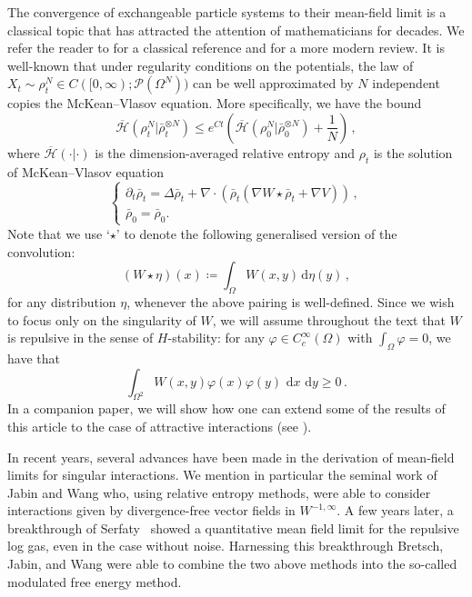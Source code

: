 \documentclass[a4paper,10pt,twoside]{amsart}
\newcommand{\dx}[1]{\,\mathrm{d}#1}  %
\theoremstyle{remark}
\theoremstyle{definition}
\numberwithin{equation}{section}
\newcommand{\0}{{\bf 0}}
\newcommand{\+}{\hspace{-.5ex}+\hspace{-.5ex}}
\begin{document}
The convergence of exchangeable particle systems to their mean-field limit is a classical topic that has attracted the attention of mathematicians for decades. We refer the reader to \cite{Sznitman1991} for a classical reference and \cite{ChaintronDiez2022a,ChaintronDiez2022b} for a more modern review. It is well-known that under regularity conditions on the potentials, the law of $X_t\sim \rho^N_{t}\in C([0,\infty);\mathcal{P}(\Omega^N))$ can be well approximated by $N$ independent copies the McKean--Vlasov equation. More specifically, we have the bound
\begin{equation}\label{eq:meanfield}
  \overline{\mathcal{H}}(\rho^N_t|\bar{\rho}^{\otimes N}_t)\le e^{Ct}\left(\overline{\mathcal{H}}(\rho^N_{0}|\bar\rho^{\otimes N}_{0})+\frac{1}{N}\right) \, ,
\end{equation}
where $\overline{\mathcal{H}}(\cdot|\cdot)$ is the dimension-averaged relative entropy and $\rho^{}_t$ is the solution of McKean--Vlasov equation
\begin{equation}
\label{eq:MVpde}
\begin{cases}
\partial_t \bar\rho_t = \Delta \bar\rho_t + \nabla \cdot (\bar\rho_t(\nabla W \star \bar\rho_t+\nabla V)) \, ,\\
\bar\rho_0=\bar\rho_{0}.
\end{cases} 
\end{equation}
Note that we use `$\star$' to denote the following generalised version of the convolution:
\begin{equation}
  (W \star \eta)(x)\coloneqq \int_{\Omega} W(x,y) \, \mathrm{d}\eta(y) \, , 
\end{equation}
for any distribution $\eta$, whenever the above pairing is well-defined. Since we wish to focus only on the singularity of $W$, we will assume throughout the text that $W$ is repulsive in the sense of $H$-stability: for any $\varphi \in C^\infty_c(\Omega)$ with $\int_{\Omega} \varphi =0$, we have that
\begin{equation}
 \int_{\Omega^2} W(x,y) \varphi(x)\varphi(y) \, \dx x\,\dx{y} \geq 0 \, . 
\end{equation} 
In a companion paper, we will show how one can extend some of the results of this article to the case of attractive interactions (see \cite{Delgadino2025}).



In recent years, several advances have been made in the derivation of mean-field limits for singular interactions. We mention in particular the seminal work of Jabin and Wang \cite{jabin2018quantitative} who, using relative entropy methods, were able to consider interactions given by divergence-free vector fields in $W^{-1,\infty}$. A few years later, a breakthrough of Serfaty~\cite{serfaty2020mean} showed a quantitative mean field limit for the repulsive log gas, even in the case without noise. Harnessing this breakthrough Bretsch, Jabin, and Wang \cite{BJW1} were able to combine the two above methods into  the so-called modulated free energy method.
\end{document}
